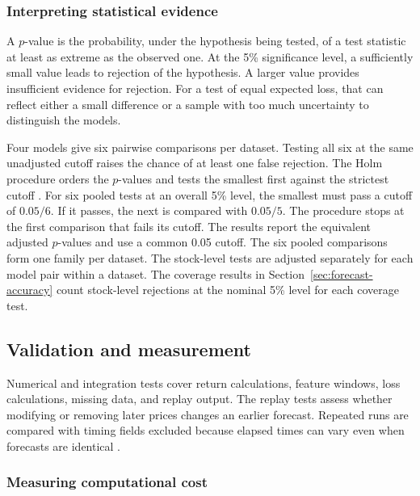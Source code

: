 \documentclass[
	12pt,				%
	openright,			%
	twoside,			%
	a4paper,
	chapter=TITLE,
	english				%
	]{abntex2}
\begin{document}
\subsubsection{Interpreting statistical evidence}

A $p$-value is the probability, under the hypothesis being tested, of a test statistic at least as extreme as the observed one. At the 5\% significance level, a sufficiently small value leads to rejection of the hypothesis. A larger value provides insufficient evidence for rejection. For a test of equal expected loss, that can reflect either a small difference or a sample with too much uncertainty to distinguish the models.

Four models give six pairwise comparisons per dataset. Testing all six at the same unadjusted cutoff raises the chance of at least one false rejection. The Holm procedure orders the $p$-values and tests the smallest first against the strictest cutoff \cite{holm-1979}. For six pooled tests at an overall 5\% level, the smallest must pass a cutoff of $0.05/6$. If it passes, the next is compared with $0.05/5$. The procedure stops at the first comparison that fails its cutoff. The results report the equivalent adjusted $p$-values and use a common 0.05 cutoff. The six pooled comparisons form one family per dataset. The stock-level tests are adjusted separately for each model pair within a dataset. The coverage results in Section~\ref{sec:forecast-accuracy} count stock-level rejections at the nominal 5\% level for each coverage test.

\subsection{Validation and measurement}

Numerical and integration tests cover return calculations, feature windows, loss calculations, missing data, and replay output. The replay tests assess whether modifying or removing later prices changes an earlier forecast. Repeated runs are compared with timing fields excluded because elapsed times can vary even when forecasts are identical \cite{project-atam}.

\subsubsection{Measuring computational cost}
\end{document}
